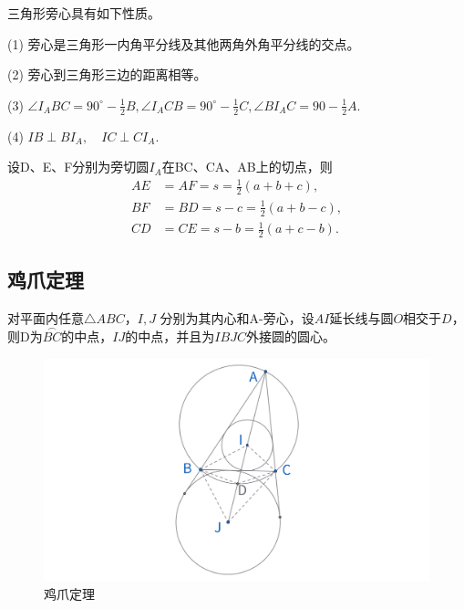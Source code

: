 \begin{proposition}[旁心性质]
    三角形旁心具有如下性质。
    
    (1) 旁心是三角形一内角平分线及其他两角外角平分线的交点。

    (2) 旁心到三角形三边的距离相等。

    (3) $\angle I_ABC = 90^\circ - \frac{1}{2}B, \angle I_ACB = 90^\circ - \frac{1}{2}C, \angle BI_AC=90 - \frac{1}{2}A.$

    (4) $IB\perp BI_A, \quad IC\perp CI_A.$
\end{proposition}

\begin{proposition}[切线长性质]
    设D、E、F分别为旁切圆$I_A$在BC、CA、AB上的切点，则
    $$
    \begin{aligned}
    AE&=AF= s = \frac{1}{2}(a+b+c),\\
    BF&=BD=s - c =\frac{1}{2}(a+b-c),\\
    CD&=CE=s - b= \frac{1}{2}(a+c-b).
    \end{aligned}
    $$
\end{proposition}


\newpage 
\subsection{鸡爪定理}
\begin{theorem}[鸡爪定理]
    对平面内任意$\triangle ABC$，$I,J$ 分别为其内心和A-旁心，设$AI$延长线与圆$O$相交于$D$，则D为$\overset{{\frown}}{BC}$的中点，$IJ$的中点，并且为$IBJC$外接圆的圆心。
\end{theorem}

\begin{figure}[H]
    \centering
    \includegraphics[width=\linewidth]{figures/三角形五心/鸡爪定理2.png}
    \caption{鸡爪定理}
\end{figure}

